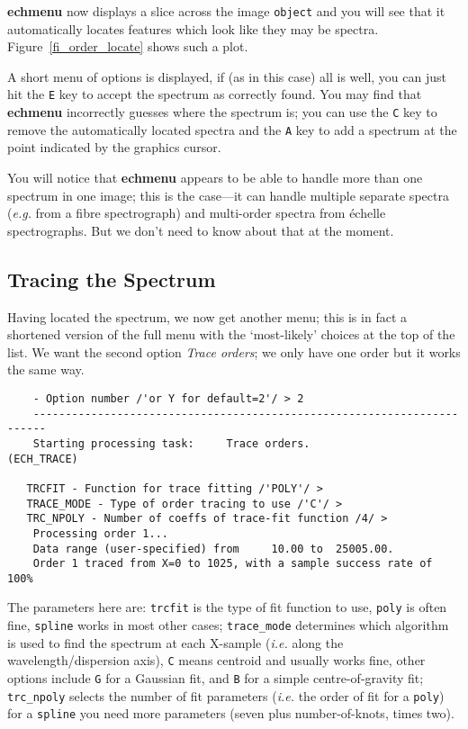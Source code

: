 \documentclass[twoside,11pt]{article}
\newcommand{\xref}[3]{#1}
\newcommand{\scspec}[2]{#1}
\newcommand{\scspec}[2]{#2}
\begin{document}
{\bf echmenu} now displays a slice across the image \verb+object+ and you
will see that it automatically locates features which look like they may be
spectra.  \scspec{Figure~\ref{fi_order_locate}}{The figure above} shows
such a plot.

A short menu of options is displayed, if (as in this case) all is well,
you can just hit the \verb+E+ key to accept the spectrum as correctly found.
You may find that {\bf echmenu} incorrectly guesses where the spectrum is;
you can use the \verb+C+ key to remove the automatically located spectra and
the \verb+A+ key to add a spectrum at the point indicated by the graphics
cursor.

You will notice that {\bf echmenu} appears to be able to handle more than
one spectrum in one image; this is the case\scspec{---}{ - }it can handle
multiple separate spectra ({\it{e.g.}} from a fibre spectrograph) and
multi-order spectra from \'{e}chelle spectrographs.  But we don't need to
know about that at the moment.


\subsection{Tracing the Spectrum}

Having located the spectrum, we now get another menu; this is in fact
a shortened version of the full menu with the `most-likely' choices at
the top of the list.
We want the \xref{second option {\sl Trace orders}}{sun152}{option2};
we only have one order but it works the same way.

{
\scspec{\small}{ }
\begin{verbatim}
    - Option number /'or Y for default=2'/ > 2
    ------------------------------------------------------------------------
    Starting processing task:     Trace orders.                  (ECH_TRACE)

   TRCFIT - Function for trace fitting /'POLY'/ >
   TRACE_MODE - Type of order tracing to use /'C'/ >
   TRC_NPOLY - Number of coeffs of trace-fit function /4/ >
    Processing order 1...
    Data range (user-specified) from     10.00 to  25005.00.
    Order 1 traced from X=0 to 1025, with a sample success rate of 100%
\end{verbatim}
}

The parameters here are:
\xref{{\tt{trcfit}}}{sun152}{par_TRCFIT} is the type of fit function to use,
\verb+poly+ is often fine, \verb+spline+ works in most other cases;
\xref{{\tt{trace\_mode}}}{sun152}{par_TRACE_MODE} determines which algorithm
is used to find the spectrum at each X-sample ({\it{i.e.}} along the
wavelength/dispersion axis), \verb+C+ means centroid and
usually works fine, other options include \verb+G+ for a Gaussian fit, and
\verb+B+ for a simple centre-of-gravity fit;
\xref{{\tt trc\_npoly}}{sun152}{par_TRC_NPOLY} selects the number of
fit parameters ({\it{i.e.}} the order of fit for a \verb+poly+) for
a \verb+spline+ you need more parameters (seven plus
number-of-knots, times two).
\end{document}
